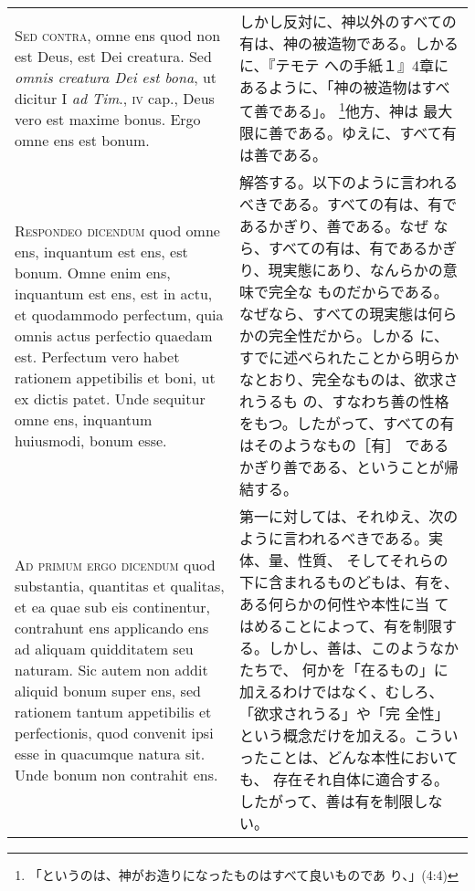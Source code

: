 \documentclass[10pt]{jsarticle}
\begin{document}
\begin{longtable}{p{21em}p{21em}}
\\

{\scshape Sed contra}, omne ens quod non est Deus, est Dei creatura. Sed
 {\itshape omnis creatura Dei est bona}, ut dicitur I {\itshape ad
 Tim}., {\scshape iv} cap., Deus vero est maxime bonus. Ergo omne ens
 est bonum.

&

しかし反対に、神以外のすべての有は、神の被造物である。しかるに、『テモテ
 への手紙１』4章にあるように、「神の被造物はすべて善である」。
 \footnote{「というのは、神がお造りになったものはすべて良いものであ
 り、」(4:4)}他方、神は
 最大限に善である。ゆえに、すべて有は善である。

\\

{\scshape Respondeo dicendum} quod omne ens, inquantum est ens, est
 bonum. Omne enim ens, inquantum est ens, est in actu, et quodammodo
 perfectum, quia omnis actus perfectio quaedam est. Perfectum vero habet
 rationem appetibilis et boni, ut ex dictis patet. Unde sequitur omne
 ens, inquantum huiusmodi, bonum esse.

&

解答する。以下のように言われるべきである。すべての有は、有であるかぎり、善である。なぜ
 なら、すべての有は、有であるかぎり、現実態にあり、なんらかの意味で完全な
 ものだからである。なぜなら、すべての現実態は何らかの完全性だから。しかる
 に、すでに述べられたことから明らかなとおり、完全なものは、欲求されうるも
 の、すなわち善の性格をもつ。したがって、すべての有はそのようなもの［有］
 であるかぎり善である、ということが帰結する。

\\


{\scshape Ad primum ergo dicendum} quod substantia, quantitas et qualitas, et
 ea quae sub eis continentur, contrahunt ens applicando ens ad aliquam
 quidditatem seu naturam. Sic autem non addit aliquid bonum super ens,
 sed rationem tantum appetibilis et perfectionis, quod convenit ipsi
 esse in quacumque natura sit. Unde bonum non contrahit ens.

&

第一に対しては、それゆえ、次のように言われるべきである。実体、量、性質、
 そしてそれらの下に含まれるものどもは、有を、ある何らかの何性や本性に当
 てはめることによって、有を制限する。しかし、善は、このようなかたちで、
 何かを「在るもの」に加えるわけではなく、むしろ、「欲求されうる」や「完
 全性」という概念だけを加える。こういったことは、どんな本性においても、
 存在それ自体に適合する。したがって、善は有を制限しない。


\end{longtable}
\end{document}
